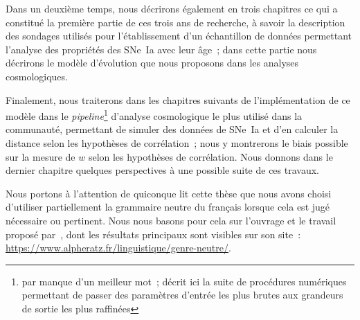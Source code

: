 \documentclass[../main/main.tex]{subfiles}
\begin{document}
Dans un deuxième temps, nous décrirons également en trois chapitres ce qui a
constitué la première partie de ces trois ans de recherche, à savoir la
description des sondages utilisés pour l'établissement d'un échantillon de
données permettant l'analyse des propriétés des SNe~Ia avec leur âge~; dans
cette partie nous décrirons le modèle d'évolution que nous proposons dans les
analyses cosmologiques.

Finalement, nous traiterons dans les chapitres suivants de l'implémentation de
ce modèle dans le \textit{pipeline}\footnote{par manque d'un meilleur mot~;
    décrit ici la suite de procédures numériques permettant de passer des
    paramètres d'entrée les plus brutes aux grandeurs de sortie les plus
raffinées} d'analyse cosmologique le plus utilisé dans la communauté,
permettant de simuler des données de SNe~Ia et d'en calculer la distance
selon les hypothèses de corrélation~; nous y montrerons le biais possible
sur la mesure de $w$ selon les hypothèses de corrélation. Nous donnons dans
le dernier chapitre quelques perspectives à une possible suite de ces
travaux.

\vfill

Nous portons à l'attention de quiconque lit cette thèse que nous avons choisi
d'utiliser partiellement la grammaire neutre du français lorsque cela est jugé
nécessaire ou pertinent. Nous nous basons pour cela sur l'ouvrage et le travail
proposé par~\cite{alpheratz2018}, dont les résultats principaux sont visibles
sur son site~: \href{https://www.alpheratz.fr/linguistique/genre-neutre/}
{https://www.alpheratz.fr/linguistique/genre-neutre/}.

\vfill

% 
% 
\end{document}
